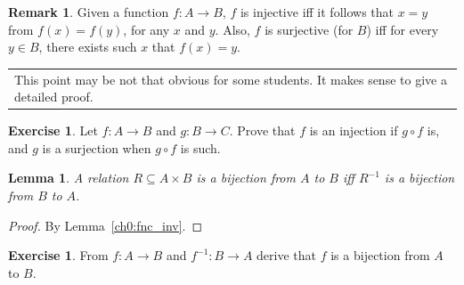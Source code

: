 \documentclass[12pt,notitlepage]{article}
\theoremstyle{plain}
\newtheorem{lemma}[thm]{Lemma}
\theoremstyle{definition}
\newtheorem{exc}[thm]{Exercise}
\newtheorem{rem}[thm]{Remark}
\theoremstyle{plain}
\newcommand{\sbs}{\subseteq}
\newcommand{\1}{\mathbf{1}}
\newcommand{\0}{\mathbf{0}}
\newcommand{\mcomm}[1]{
\medskip\noindent\begin{tabular}{| l}
\parbox{0.99\textwidth}{{\small
#1 }}\end{tabular}
\smallskip}
\begin{document}
\begin{rem}
Given a function $f\colon A \to B$, $f$ is injective iff it follows that $x = y$ from $f(x) = f(y)$, for any $x$ and $y$. Also, $f$ is surjective (for $B$) iff for every $y \in B$, there exists such $x$ that $f(x) = y$.
\end{rem}
\mcomm{This point may be not that obvious for some students. It makes sense to give a detailed proof.}

\begin{exc}
Let $f\colon A \to B$ and $g\colon B \to C$. Prove that $f$ is an injection if $g\circ f$ is, and $g$ is a surjection when $g \circ f$ is such.
\end{exc}

\begin{lemma}\label{ch0:bi_inv}
A relation $R \sbs A \times B$ is a bijection from $A$ to $B$ iff $R^{-1}$ is a bijection from $B$ to $A$.
\end{lemma}
\begin{proof} By Lemma~\ref{ch0:fnc_inv}.
\end{proof}

\begin{exc}
From $f\colon A \to B$ and $f^{-1}\colon B \to A$ derive that $f$ is a bijection from $A$ to $B$.
\end{exc}
\end{document}
